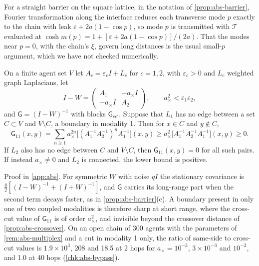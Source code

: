 \begin{remark}\label{rem:abs-interface}
For a straight barrier on the square lattice, in the notation of \cref{prop:abs-barrier}, Fourier transformation along the interface reduces each transverse mode $p$ exactly to the chain with leak $\varepsilon+2a(1-\cos p)$, so mode $p$ is transmitted with $\mathcal T$ evaluated at $\cosh m(p)=1+[\varepsilon+2a(1-\cos p)]/(2a)$. That the modes near $p=0$, with the chain's $\xi$, govern long distances is the usual small-$p$ argument, which we have not checked numerically.
\end{remark}

\begin{proposition}\label{prop:abs-bypass}
On a finite agent set $V$ let $A_c=\varepsilon_cI+L_c$ for $c=1,2$, with $\varepsilon_c>0$ and $L_c$ weighted graph Laplacians, let
\[
I-W=\begin{pmatrix}A_1&-a_\times I\\-a_\times I&A_2\end{pmatrix},\qquad a_\times^2<\varepsilon_1\varepsilon_2,
\]
and $\mathsf G=(I-W)^{-1}$ with blocks $\mathsf G_{cc'}$. Suppose that $L_1$ has no edge between a set $C\subset V$ and $V\setminus C$, a boundary in modality 1. Then for $x\in C$ and $y\notin C$,
\[
\mathsf G_{11}(x,y)=\sum_{n\ge1}a_\times^{2n}\bigl[(A_1^{-1}A_2^{-1})^nA_1^{-1}\bigr](x,y)\ge a_\times^2\bigl[A_1^{-1}A_2^{-1}A_1^{-1}\bigr](x,y)\ge0.
\]
If $L_2$ also has no edge between $C$ and $V\setminus C$, then $\mathsf G_{11}(x,y)=0$ for all such pairs. If instead $a_\times\ne0$ and $L_2$ is connected, the lower bound is positive.
\end{proposition}

Proof in \cref{app:abs}. For symmetric $W$ with noise $qI$ the stationary covariance is $\frac q2[(I-W)^{-1}+(I+W)^{-1}]$, and $\mathsf G$ carries its long-range part when the second term decays faster, as in \cref{prop:abs-barrier}(c). A boundary present in only one of two coupled modalities is therefore sharp at short range, where the cross-cut value of $\mathsf G_{11}$ is of order $a_\times^2$, and invisible beyond the crossover distance of \cref{prop:abs-crossover}. On an open chain of 300 agents with the parameters of \cref{rem:abs-multiplex} and a cut in modality 1 only, the ratio of same-side to cross-cut values is $1.9\times10^3$, 208 and 18.5 at 2 hops for $a_\times=10^{-3}$, $3\times10^{-3}$ and $10^{-2}$, and 1.0 at 40 hops (\cref{chk:abs-bypass}).


